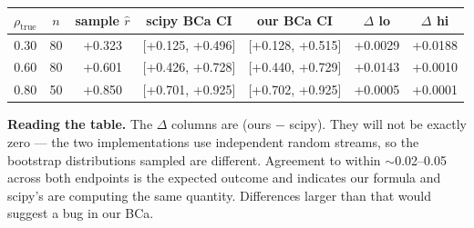 \documentclass[11pt]{article}
\begin{document}
\begin{center}
\begin{tabular}{ccccccc}
\toprule
$\rho_{\text{true}}$ & $n$ & sample $\hat r$ & scipy BCa CI & our BCa CI & $\Delta$ lo & $\Delta$ hi \\
\midrule
0.30 & 80 & +0.323 & [+0.125, +0.496] & [+0.128, +0.515] & +0.0029 & +0.0188 \\
0.60 & 80 & +0.601 & [+0.426, +0.728] & [+0.440, +0.729] & +0.0143 & +0.0010 \\
0.80 & 50 & +0.850 & [+0.701, +0.925] & [+0.702, +0.925] & +0.0005 & +0.0001 \\
\bottomrule
\end{tabular}
\end{center}

\textbf{Reading the table.} The $\Delta$ columns are (ours $-$ scipy). They will not be exactly zero --- the two implementations use independent random streams, so the bootstrap distributions sampled are different. Agreement to within $\sim$0.02--0.05 across both endpoints is the expected outcome and indicates our formula and scipy's are computing the same quantity. Differences larger than that would suggest a bug in our BCa.
\end{document}
